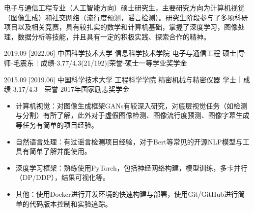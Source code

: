 \documentclass[zh]{resume}
\begin{document}
\makeheader

{\onehalfspacing\hspace{2em}%
电子与通信工程专业（人工智能方向）硕士研究生，主要研究方向为计算机视觉（图像生成）和社交网络（流行度预测，谣言检测）。研究生阶段参与了多项科研项目以及相关竞赛，具有较扎实的数学和计算机基础，掌握了深度学习，图像处理，数据分析等技能，并且具有一定的积极实践、探索合作的精神。
\par}

\begin{educations}
  \education%
    {2019.09}%
    [2022.06]%
    {中国科学技术大学}%
    {信息科学技术学院}%
    {电子与通信工程}%
    {硕士|导师-毛震东｜成绩-3.77/4.3(21/192)|荣誉-硕士一等学业奖学金}

  \separator{0.5ex}
  \education%
    {2015.09}%
    [2019.06]%
    {中国科学技术大学}%
    {工程科学学院}%
    {精密机械与精密仪器}%
    {学士｜成绩-3.17/4.3｜荣誉-2017年国家励志奖学金}
\end{educations}

\begin{competences}
\end{competences}

\begin{itemize}
  \item 计算机视觉：对图像生成框架GANs有较深入研究，对底层视觉任务（如检测与分割）有所了解，此外对于虚假图像检测、图像流行度预测、图像字幕生成等任务有简单的项目经验。
  \item 自然语言处理：有过谣言检测项目经验，对于Bert等常见的开源NLP模型与工具有简单了解并能使用。
  \item 深度学习框架：熟练使用PyTorch，包括神经网络构建，模型训练，多卡并行（DP/DDP），结果可视化等。
  \item 其他：使用Docker进行开发环境的快速构建与部署，使用Git/GitHub进行简单的代码版本控制和实验追踪。
\end{itemize}
\end{document}
